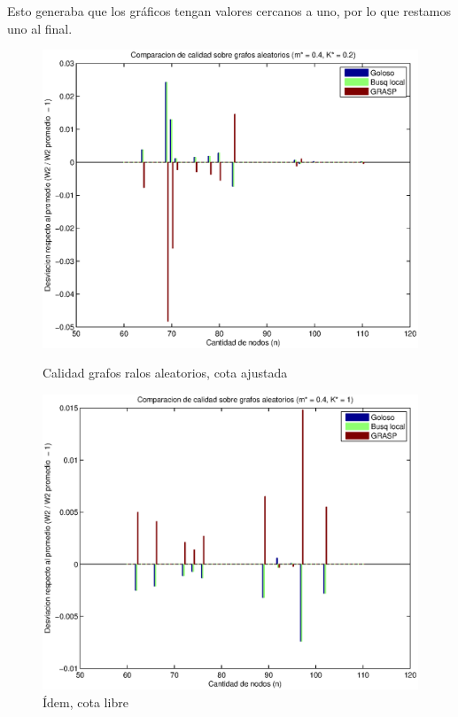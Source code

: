 Esto generaba que los gráficos tengan valores cercanos a uno, por lo que restamos uno al final.

\begin{figure}[H]
    \begin{minipage}{0.5\linewidth}
      \includegraphics[width=\linewidth]{graficos/todos_calidad_m04_K02.eps}
      \caption{Calidad grafos ralos aleatorios, cota ajustada}\label{fig:ralos-ajustada}
    \end{minipage}
    \hfill
    \begin{minipage}{0.5\linewidth}
      \includegraphics[width=\linewidth]{graficos/todos_calidad_m04_K1.eps}
      \caption{Ídem, cota libre}\label{fig:ralos-libre}
    \end{minipage}    
\end{figure}

